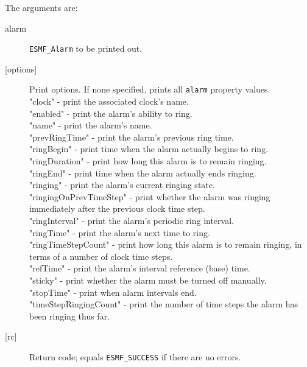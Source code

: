        The arguments are:
       \begin{description}
       \item[alarm]
            {\tt ESMF\_Alarm} to be printed out.
       \item[{[options]}]
            Print options. If none specified, prints all {\tt alarm} property values.\\
            "clock"        - print the associated clock's name. \\
            "enabled"      - print the alarm's ability to ring. \\
            "name"         - print the alarm's name. \\
            "prevRingTime" - print the alarm's previous ring time. \\
            "ringBegin"    - print time when the alarm actually begins to ring.\\
            "ringDuration" - print how long this alarm is to remain ringing. \\
            "ringEnd"      - print time when the alarm actually ends ringing.\\
            "ringing"                - print the alarm's current ringing state.\\
            "ringingOnPrevTimeStep"  - print whether the alarm was ringing
                                       immediately after the previous clock
                                       time step. \\
            "ringInterval" - print the alarm's periodic ring interval. \\
            "ringTime"     - print the alarm's next time to ring. \\
            "ringTimeStepCount" - print how long this alarm is to remain
                                  ringing, in terms of a number of clock time
                                  steps. \\
            "refTime"      - print the alarm's interval reference (base) time. \\
            "sticky"       - print whether the alarm must be turned off
                             manually. \\
            "stopTime"     - print when alarm intervals end. \\
            "timeStepRingingCount"   - print the number of time steps the
                                       alarm has been ringing thus far. \\
       \item[{[rc]}]
            Return code; equals {\tt ESMF\_SUCCESS} if there are no errors.
       \end{description}
   
